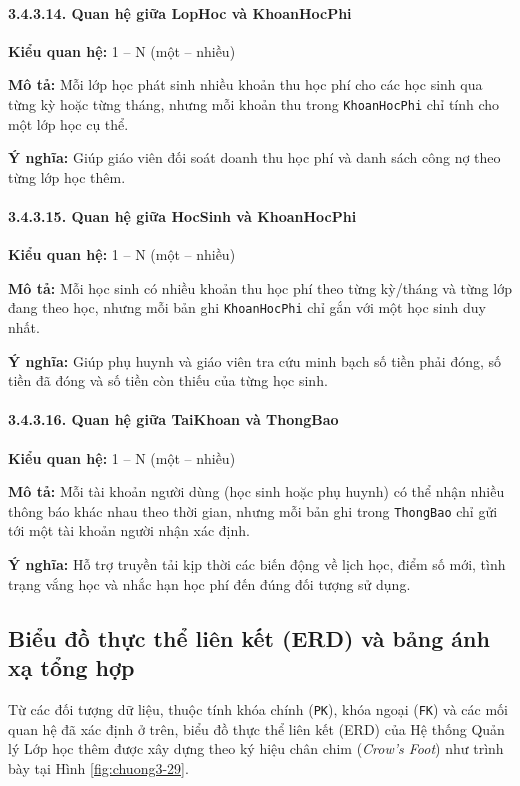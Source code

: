 \paragraph{3.4.3.14. Quan hệ giữa LopHoc và KhoanHocPhi}\mbox{}\par
\textbf{Kiểu quan hệ:} 1 -- N (một -- nhiều)\par
\textbf{Mô tả:} Mỗi lớp học phát sinh nhiều khoản thu học phí cho các học sinh qua từng kỳ hoặc từng tháng, nhưng mỗi khoản thu trong \texttt{KhoanHocPhi} chỉ tính cho một lớp học cụ thể.\par
\textbf{Ý nghĩa:} Giúp giáo viên đối soát doanh thu học phí và danh sách công nợ theo từng lớp học thêm.

\paragraph{3.4.3.15. Quan hệ giữa HocSinh và KhoanHocPhi}\mbox{}\par
\textbf{Kiểu quan hệ:} 1 -- N (một -- nhiều)\par
\textbf{Mô tả:} Mỗi học sinh có nhiều khoản thu học phí theo từng kỳ/tháng và từng lớp đang theo học, nhưng mỗi bản ghi \texttt{KhoanHocPhi} chỉ gắn với một học sinh duy nhất.\par
\textbf{Ý nghĩa:} Giúp phụ huynh và giáo viên tra cứu minh bạch số tiền phải đóng, số tiền đã đóng và số tiền còn thiếu của từng học sinh.

\paragraph{3.4.3.16. Quan hệ giữa TaiKhoan và ThongBao}\mbox{}\par
\textbf{Kiểu quan hệ:} 1 -- N (một -- nhiều)\par
\textbf{Mô tả:} Mỗi tài khoản người dùng (học sinh hoặc phụ huynh) có thể nhận nhiều thông báo khác nhau theo thời gian, nhưng mỗi bản ghi trong \texttt{ThongBao} chỉ gửi tới một tài khoản người nhận xác định.\par
\textbf{Ý nghĩa:} Hỗ trợ truyền tải kịp thời các biến động về lịch học, điểm số mới, tình trạng vắng học và nhắc hạn học phí đến đúng đối tượng sử dụng.

\subsection{Biểu đồ thực thể liên kết (ERD) và bảng ánh xạ tổng hợp}

Từ các đối tượng dữ liệu, thuộc tính khóa chính (\texttt{PK}), khóa ngoại (\texttt{FK}) và các mối quan hệ đã xác định ở trên, biểu đồ thực thể liên kết (ERD) của Hệ thống Quản lý Lớp học thêm được xây dựng theo ký hiệu chân chim (\textit{Crow's Foot}) như trình bày tại Hình \ref{fig:chuong3-29}.

